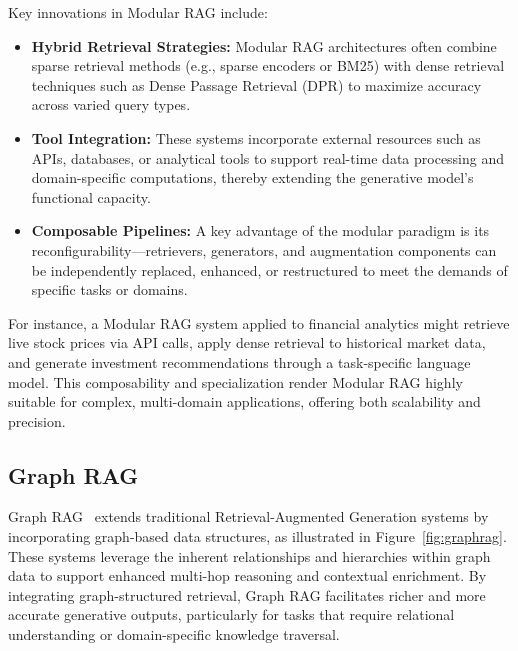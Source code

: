 Key innovations in Modular RAG include:

\begin{itemize}
    \item \textbf{Hybrid Retrieval Strategies:} Modular RAG architectures often combine sparse retrieval methods (e.g., sparse encoders or BM25) with dense retrieval techniques such as Dense Passage Retrieval (DPR) \cite{karpukhin2020dense} to maximize accuracy across varied query types.
    
    \item \textbf{Tool Integration:} These systems incorporate external resources such as APIs, databases, or analytical tools to support real-time data processing and domain-specific computations, thereby extending the generative model's functional capacity.
    
    \item \textbf{Composable Pipelines:} A key advantage of the modular paradigm is its reconfigurability—retrievers, generators, and augmentation components can be independently replaced, enhanced, or restructured to meet the demands of specific tasks or domains.
\end{itemize}

For instance, a Modular RAG system applied to financial analytics might retrieve live stock prices via API calls, apply dense retrieval to historical market data, and generate investment recommendations through a task-specific language model. This composability and specialization render Modular RAG highly suitable for complex, multi-domain applications, offering both scalability and precision.


\subsection{Graph RAG}
Graph RAG~\cite{yao2023graphrag} extends traditional Retrieval-Augmented Generation systems by incorporating graph-based data structures, as illustrated in Figure~\ref{fig:graphrag}. These systems leverage the inherent relationships and hierarchies within graph data to support enhanced multi-hop reasoning and contextual enrichment. By integrating graph-structured retrieval, Graph RAG facilitates richer and more accurate generative outputs, particularly for tasks that require relational understanding or domain-specific knowledge traversal.

